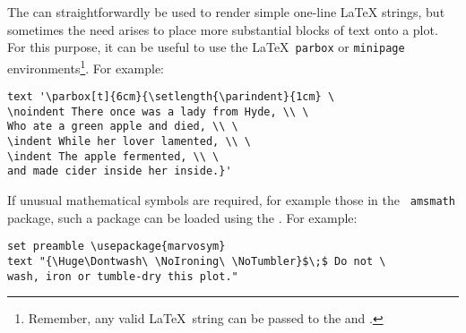 The  can straightforwardly be used to render simple one-line
\LaTeX{} strings, but sometimes the need arises to place more
substantial blocks of text onto a plot. For this purpose, it can be useful to
use the \LaTeX\ {\tt parbox} or {\tt minipage} environments\footnote{Remember,
any valid \LaTeX\ string can be passed to the  and .}. For example:

\begin{verbatim}
text '\parbox[t]{6cm}{\setlength{\parindent}{1cm} \
\noindent There once was a lady from Hyde, \\ \
Who ate a green apple and died, \\ \
\indent While her lover lamented, \\ \
\indent The apple fermented, \\ \
and made cider inside her inside.}'
\end{verbatim}

\begin{center}
\end{center}

If unusual mathematical symbols are required, for example those in the {\tt
amsmath} package, such a package
can be loaded using the \indcmdt{set preamble}. For example:

\begin{verbatim}
set preamble \usepackage{marvosym}
text "{\Huge\Dontwash\ \NoIroning\ \NoTumbler}$\;$ Do not \
wash, iron or tumble-dry this plot."
\end{verbatim}

\begin{center}
\end{center}

